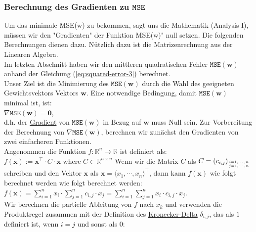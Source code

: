 \documentclass[12pt]{article}
\begin{document}
\subsubsection{Berechnung des Gradienten zu $\mathtt{MSE}$}
%
Um das minimale MSE(w) zu bekommen, sagt uns die Mathematik (Analysis I), müssen wir den "Gradienten" der Funktion MSE(w)" null setzen. Die folgenden Berechnungen dienen dazu. Nützlich dazu ist die Matrizenrechnung aus der Linearen Algebra.\\[0.2cm]
%
Im letzten Abschnitt haben wir den mittleren quadratischen Fehler $\mathtt{MSE}(\mathbf{w})$ anhand der Gleichung
(\ref{eq:squared-error-3}) berechnet.\\
Unser Ziel ist die Minimierung des $\mathtt{MSE}(\mathbf{w})$ durch die Wahl des geeigneten Gewichtsvektors Vektors $\mathbf{w}$.  Eine notwendige Bedingung, damit $\mathtt{MSE}(\mathbf{w})$ minimal ist, ist: 
\\[0.2cm]
\hspace*{1.3cm}
$\nabla \mathtt{MSE}(\mathbf{w}) = \mathbf{0}$,
\\[0.2cm]
d.h. der \href{https://en.wikipedia.org/wiki/Gradient}{Gradient}  von $\mathtt{MSE}(\mathbf{w})$ in Bezug auf
$\mathbf{w}$ muss Null sein.  Zur Vorbereitung der Berechnung von 
$\nabla \mathtt{MSE}(\mathbf{w})$, berechnen wir zunächst den Gradienten von zwei einfacheren Funktionen.\\[0.4cm]
%
Angenommen die Funktion $f:\mathbb{R}^n \rightarrow \mathbb{R}$ ist definiert als:
\\[0.2cm]
\hspace*{1.3cm}
$f(\mathbf{x}) := \mathbf{x}^\top \cdot C \cdot \mathbf{x}$ \quad where $C \in \mathbb{R}^{n \times n}$
%
Wenn wir die Matrix $C$ als $C = (c_{i,j})_{i=1,\cdots,n \atop j=1,\cdots,n}$ schreiben und den Vektor
$\mathbf{x}$ als $\mathbf{x} = \langle x_1, \cdots, x_n \rangle^\top$, dann kann $f(\mathbf{x})$ wie folgt berechnet werden
wie folgt berechnet werden:
\\[0.2cm]
\hspace*{1.3cm}
$ f(\mathbf{x}) = \sum\limits_{i=1}^n x_i \cdot \sum\limits_{j=1}^n c_{i,j} \cdot x_j = \sum\limits_{i=1}^n \sum\limits_{j=1}^n x_i \cdot c_{i,j} \cdot x_j $.
\\[0.2cm]
Wir berechnen die partielle Ableitung von $f$ nach $x_k$ und verwenden die Produktregel zusammen mit der
Definition des \href{https://en.wikipedia.org/wiki/Kronecker_delta}{Kronecker-Delta} $\delta_{i,j}$, das
als $1$ definiert ist, wenn $i = j$ und sonst als $0$:
\end{document}

